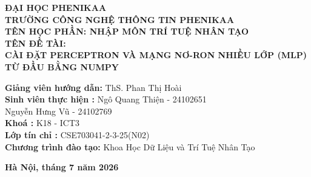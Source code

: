 \documentclass[13pt,a4paper]{article}
\begin{document}
\begin{titlepage}
    \begin{center}
        {\Large \textbf{ĐẠI HỌC PHENIKAA}} \\[0.2cm]
        {\Large \textbf{TRƯỜNG CÔNG NGHỆ THÔNG TIN PHENIKAA}} \\[2cm]
        
        
        {\large \textbf{TÊN HỌC PHẦN: NHẬP MÔN TRÍ TUỆ NHÂN TẠO}} \\[1.5cm]
        
        {\Large \textbf{TÊN ĐỀ TÀI:}} \\[0.5cm]
        {\Large \textbf{CÀI ĐẶT PERCEPTRON VÀ MẠNG NƠ-RON NHIỀU LỚP (MLP) TỪ ĐẦU BẰNG NUMPY}} \\[2.5cm]
    \end{center}

    \begin{flushleft}
        \large
        \textbf{Giảng viên hướng dẫn:} ThS. Phan Thị Hoài \\[0.5cm]
        \textbf{Sinh viên thực hiện \hspace{0.1cm}:} Ngô Quang Thiện - 24102651 \\
        \hspace{4.8cm} Nguyễn Hưng Vũ - 24102769 \\[0.5cm]
        \textbf{Khoá \hspace{2.9cm}:} K18 - ICT3 \\
        \textbf{Lớp tín chỉ \hspace{1.7cm}:} CSE703041-2-3-25(N02) \\
        \textbf{Chương trình đào tạo:} Khoa Học Dữ Liệu và Trí Tuệ Nhân Tạo \\
    \end{flushleft}
    
    \vfill
    \begin{center}
        \textbf{Hà Nội, tháng 7 năm 2026}
    \end{center}
\end{titlepage}
\newpage %

\renewcommand{\contentsname}{\begin{center} MỤC LỤC \end{center}}
\tableofcontents
\newpage
\end{document}
